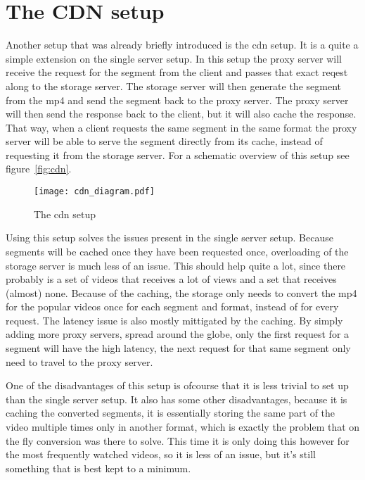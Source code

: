\documentclass[twoside,openright]{uva-bachelor-thesis}
\begin{document}
\section{The CDN setup}
Another setup that was already briefly introduced is the \gls{cdn} setup. It is
a quite a simple extension on the single server setup. In this setup the proxy
server will receive the request for the segment from the client and passes that
exact reqest along to the storage server. The storage server will then generate
the segment from the mp4 and send the segment back to the proxy server.  The
proxy server will then send the response back to the client, but it will also
cache the response. That way, when a client requests the same segment in the
same format the proxy server will be able to serve the segment directly from its
cache, instead of requesting it from the storage server. For a schematic
overview of this setup see figure~\vref{fig:cdn}.

\begin{figure}
    \texttt{[image: cdn\_diagram.pdf]}
    \caption{The \gls{cdn} setup}\label{fig:cdn}
\end{figure}

Using this setup solves the issues present in the single server
setup. Because segments will be cached once they have been requested once,
overloading of the storage server is much less of an issue. This should help
quite a lot, since there probably is a set of videos that receives a lot of
views and a set that receives (almost) none. Because of the caching, the storage
only needs to convert the mp4 for the popular videos once for each segment and
format, instead of for every request.
The latency issue is also mostly
mittigated by the caching. By simply adding more proxy servers, spread around
the globe, only the first request for a segment will have the high latency, the
next request for that same segment only need to travel to the proxy server.

One of the disadvantages of this setup is ofcourse that it is less trivial to
set up than the single server setup. It also has some other disadvantages,
because it is caching the converted segments, it is essentially storing the same
part of the video multiple times only in another format, which is exactly the
problem that on the fly conversion was there to solve. This time it is only
doing this however for the most frequently watched videos, so it is less of an
issue, but it's still something that is best kept to a minimum.
\end{document}
